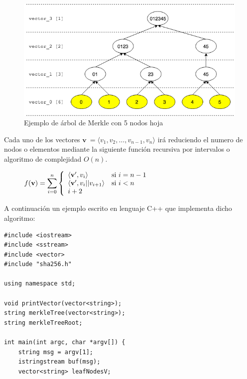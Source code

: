 \documentclass{article}
\begin{document}
\begin{enumerate}
        \begin{figure}[H]
        \centering
            \includegraphics[scale=0.53]{img/Merkle_tree_05_leaves_nodes}
            \caption{Ejemplo de árbol de Merkle con 5 nodos hoja}
        \end{figure}
        
        Cada uno de los vectores $\mathbf{v} \ = \langle v_{1}, v_{2}, \dots, v_{n - 1}, v_{n} \rangle$ irá reduciendo el numero de nodos o elementos mediante la siguiente función recursiva por intervalos o algoritmo de complejidad $O(n)$.
        
        \begin{figure}[H]
        \centering
            $f(\mathbf{v}) = \mathlarger{\sum}_{i=0}^{n} \left \{
            \begin{array}{ll}
                \langle \mathbf{v}^{\prime}, v_{i}\rangle & \mbox{si } i=n-1 \\
                \langle \mathbf{v}^{\prime}, v_{i}||v_{i+1} \rangle & \mbox{si } i < n \\
                i+2
            \end{array}
            \right .$
        \end{figure}
        A continuación un ejemplo escrito en lenguaje C++ que implementa dicho algoritmo:
        
        \begin{verbatim}
#include <iostream>
#include <sstream>
#include <vector>
#include "sha256.h"
 
using namespace std;
 
void printVector(vector<string>);
string merkleTree(vector<string>);
string merkleTreeRoot;
 
int main(int argc, char *argv[]) {
    string msg = argv[1];
    istringstream buf(msg);
    vector<string> leafNodesV;
    

\end{verbatim}
\end{enumerate}
\end{document}
